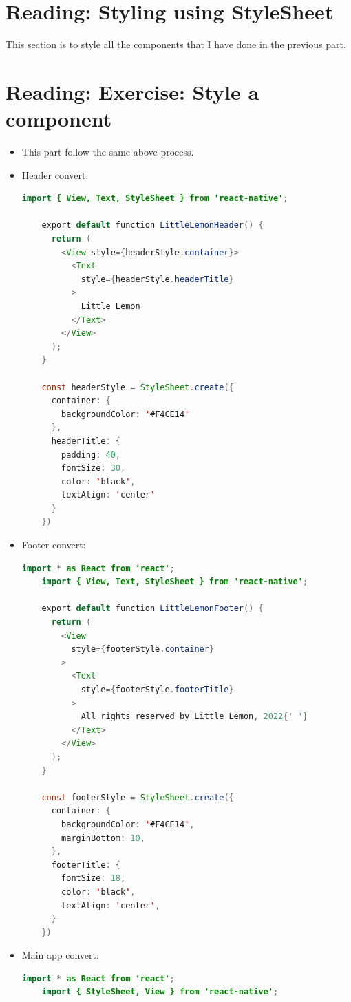 \section{Reading: Styling using StyleSheet}
This section is to style all the components that I have done in the previous part.

\section{Reading: Exercise: Style a component}
\begin{itemize}
  \item This part follow the same above process.
  \item Header convert: 
  \begin{lstlisting}[language=Java, numbers=none]
    import { View, Text, StyleSheet } from 'react-native';

    export default function LittleLemonHeader() {
      return (
        <View style={headerStyle.container}>
          <Text
            style={headerStyle.headerTitle}
          >
            Little Lemon
          </Text>
        </View>
      );
    }

    const headerStyle = StyleSheet.create({
      container: {
        backgroundColor: '#F4CE14'
      },
      headerTitle: {
        padding: 40,
        fontSize: 30,
        color: 'black',
        textAlign: 'center'
      }
    })
  \end{lstlisting}
  \item Footer convert:
  \begin{lstlisting}[language=Java, numbers=none]
    import * as React from 'react';
    import { View, Text, StyleSheet } from 'react-native';

    export default function LittleLemonFooter() {
      return (
        <View
          style={footerStyle.container}
        >
          <Text
            style={footerStyle.footerTitle}
          >
            All rights reserved by Little Lemon, 2022{' '}
          </Text>
        </View>
      );
    }

    const footerStyle = StyleSheet.create({
      container: {
        backgroundColor: '#F4CE14',
        marginBottom: 10,
      },
      footerTitle: {
        fontSize: 18,
        color: 'black',
        textAlign: 'center',
      }
    }) 
  \end{lstlisting}
  \item Main app convert:
  \begin{lstlisting}[language=Java, numbers=none]
    import * as React from 'react';
    import { StyleSheet, View } from 'react-native';


\end{lstlisting}
\end{itemize}
